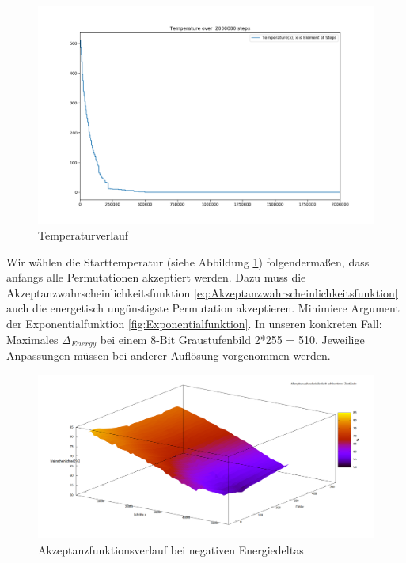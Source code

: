 \begin{figure}[H]
    \centering
    \includegraphics[width=\linewidth]{content/simulatedAnnealing/Bilder/Temperature.png}
    \caption{Temperaturverlauf}
    \label{pic:Temperaturverlauf kirkpatrick}
\end{figure}

Wir wählen die Starttemperatur (siehe Abbildung \ref{pic:Temperaturverlauf kirkpatrick}) folgendermaßen, dass 
anfangs alle Permutationen akzeptiert werden. Dazu muss die 
Akzeptanzwahrscheinlichkeitsfunktion \ref{eq:Akzeptanzwahrscheinlichkeitsfunktion} auch die energetisch
ungünstigste Permutation akzeptieren. Minimiere Argument der Exponentialfunktion \ref{fig:Exponentialfunktion}.
In unseren konkreten Fall: Maximales $\Delta_{Energy}$ bei einem 8-Bit Graustufenbild 2*255 = 510. Jeweilige 
Anpassungen müssen bei anderer Auflösung vorgenommen werden.

\begin{figure}[H]
    \centering
    \includegraphics[width=\linewidth]{content/simulatedAnnealing/Bilder/Akzeptanzwahrscheinlichkeit.png}
    \caption{Akzeptanzfunktionsverlauf bei negativen Energiedeltas}
    \label{pic:Akzeptanzfunktionsverlauf kirkpatrick}
\end{figure}

